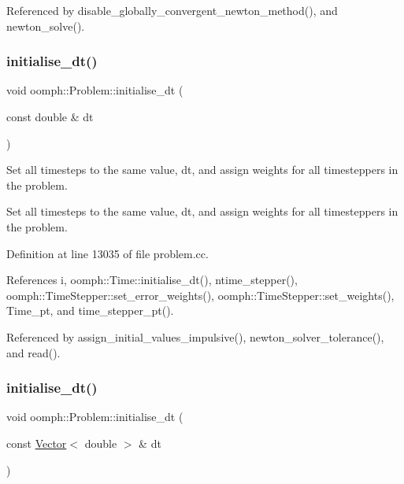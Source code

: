 Referenced by disable\+\_\+globally\+\_\+convergent\+\_\+newton\+\_\+method(), and newton\+\_\+solve().

\mbox{\label{classoomph_1_1Problem_a342b9bd9c4bc142f514907ee1d23d613}} 
\subsubsection{\texorpdfstring{initialise\+\_\+dt()}{initialise\_dt()}\hspace{0.1cm}{\footnotesize\ttfamily [1/2]}}
{\footnotesize\ttfamily void oomph\+::\+Problem\+::initialise\+\_\+dt (\begin{DoxyParamCaption}\item[{const double \&}]{dt }\end{DoxyParamCaption})}



Set all timesteps to the same value, dt, and assign weights for all timesteppers in the problem. 

Set all timesteps to the same value, dt, and assign weights for all timesteppers in the problem. 

Definition at line 13035 of file problem.\+cc.



References i, oomph\+::\+Time\+::initialise\+\_\+dt(), ntime\+\_\+stepper(), oomph\+::\+Time\+Stepper\+::set\+\_\+error\+\_\+weights(), oomph\+::\+Time\+Stepper\+::set\+\_\+weights(), Time\+\_\+pt, and time\+\_\+stepper\+\_\+pt().



Referenced by assign\+\_\+initial\+\_\+values\+\_\+impulsive(), newton\+\_\+solver\+\_\+tolerance(), and read().

\mbox{\label{classoomph_1_1Problem_a48137f1c7b297de56078f6bc0c83b675}} 
\subsubsection{\texorpdfstring{initialise\+\_\+dt()}{initialise\_dt()}\hspace{0.1cm}{\footnotesize\ttfamily [2/2]}}
{\footnotesize\ttfamily void oomph\+::\+Problem\+::initialise\+\_\+dt (\begin{DoxyParamCaption}\item[{const \hyperlink{classoomph_1_1Vector}{Vector}$<$ double $>$ \&}]{dt }\end{DoxyParamCaption})}



